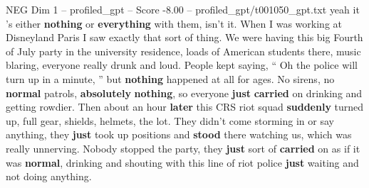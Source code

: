 \begin{textsample}{NEG Dim 1 – profiled\_gpt – Score -8.00 – profiled\_gpt/t001050\_gpt.txt}  \label{ex:f1_neg_005}
yeah it ’s either \textbf{nothing} or \textbf{everything} with them, isn't it.
When I was working at Disneyland Paris I saw exactly that sort of thing.
We were having this big Fourth of July party in the university residence, loads of American students there, music blaring, everyone really drunk and loud.
People kept saying, “ Oh the police will turn up in a minute, ” but \textbf{nothing} happened at all for ages.
No sirens, no \textbf{normal} patrols, \textbf{absolutely} \textbf{nothing}, so everyone \textbf{just} \textbf{carried} on drinking and getting rowdier.
Then about an hour \textbf{later} this CRS riot squad \textbf{suddenly} turned up, full gear, shields, helmets, the lot.
They didn't come storming in or say anything, they \textbf{just} took up positions and \textbf{stood} there watching us, which was really unnerving.
Nobody stopped the party, they \textbf{just} sort of \textbf{carried} on as if it was \textbf{normal}, drinking and shouting with this line of riot police \textbf{just} waiting and not doing anything.

\end{textsample}
